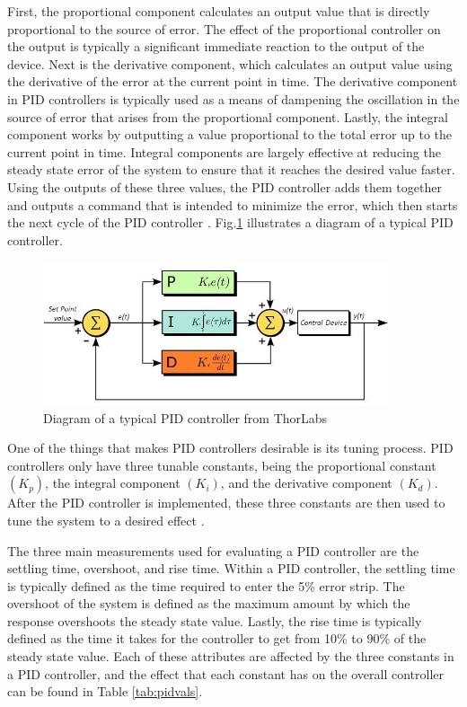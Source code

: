 \documentclass[titlepage,draft]{article}
\begin{document}
{First, the proportional component calculates an output value that is directly proportional to the source of error. The effect of the proportional controller on the output is typically a significant immediate reaction to the output of the device. Next is the derivative component, which calculates an output value using the derivative of the error at the current point in time. The derivative component in PID controllers is typically used as a means of dampening the oscillation in the source of error that arises from the proportional component. Lastly, the integral component works by outputting a value proportional to the total error up to the current point in time. Integral components are largely effective at reducing the steady state error of the system to ensure that it reaches the desired value faster.  Using the outputs of these three values, the PID controller adds them together and outputs a command that is intended to minimize the error, which then starts the next cycle of the PID controller \cite{pid_explanation}. Fig.\ref{fig:piddiagram} illustrates a diagram of a typical PID controller.\\

\begin{figure}
	\centering
	\includegraphics[width=4in]{PID2.jpg}
	\caption{Diagram of a typical PID controller from ThorLabs \cite{PIDDiagram}}
	\label{fig:piddiagram}
\end{figure}

One of the things that makes PID controllers desirable is its tuning process. PID controllers only have three tunable constants, being the proportional constant \((K_p)\), the integral component \((K_i)\), and the derivative component \((K_d)\). After the PID controller is implemented, these three constants are then used to tune the system to a desired effect \cite{pid_advantages}.

The three main measurements used for evaluating a PID controller are the settling time, overshoot, and rise time. Within a PID controller, the settling time is typically defined as the time required to enter the 5\% error strip. The overshoot of the system is defined as the maximum amount by which the response overshoots the steady state value. Lastly, the rise time is typically defined as the time it takes for the controller to get from 10\% to 90\% of the steady state value. Each of these attributes are affected by the three constants in a PID controller, and the effect that each constant has on the overall controller can be found in Table \ref{tab:pidvals}.

}
\end{document}
